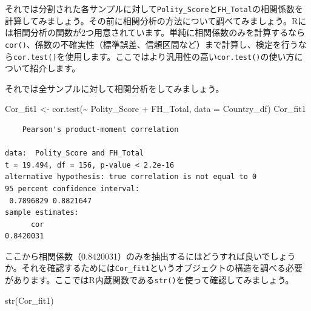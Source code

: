 \documentclass[
  a4paper,
  pandoc,
  ja=standard,
  jafont=haranoaji]{bxjsbook}
\newenvironment{Shaded}{\begin{snugshade}}{\end{snugshade}}
\newcommand{\AttributeTok}[1]{\textcolor[rgb]{0.00,0.48,0.65}{#1}}
\newcommand{\CommentTok}[1]{\textcolor[rgb]{0.37,0.37,0.37}{#1}}
\newcommand{\FunctionTok}[1]{\textcolor[rgb]{0.28,0.35,0.67}{#1}}
\newcommand{\NormalTok}[1]{\textcolor[rgb]{0.00,0.48,0.65}{#1}}
\newcommand{\OtherTok}[1]{\textcolor[rgb]{0.00,0.48,0.65}{#1}}
\newcommand{\SpecialCharTok}[1]{\textcolor[rgb]{0.37,0.37,0.37}{#1}}
\begin{document}
それでは分割された各サンプルに対して\texttt{Polity\_Score}と\texttt{FH\_Total}の相関係数を計算してみましょう。その前に相関分析の方法について調べてみましょう。Rには相関分析の関数が2つ用意されています。単純に相関係数のみを計算するなら\texttt{cor()}、係数の不確実性（標準誤差、信頼区間など）まで計算し、検定を行うなら\texttt{cor.test()}を使用します。ここではより汎用性の高い\texttt{cor.test()}の使い方について紹介します。

\begin{Shaded}
\end{Shaded}

それでは全サンプルに対して相関分析をしてみましょう。

\begin{Shaded}
\begin{Highlighting}[numbers=left,,]
\NormalTok{Cor\_fit1 }\OtherTok{\textless{}{-}} \FunctionTok{cor.test}\NormalTok{(}\SpecialCharTok{\textasciitilde{}}\NormalTok{ Polity\_Score }\SpecialCharTok{+}\NormalTok{ FH\_Total, }\AttributeTok{data =}\NormalTok{ Country\_df)}
\NormalTok{Cor\_fit1}
\end{Highlighting}
\end{Shaded}

\begin{verbatim}
    Pearson's product-moment correlation

data:  Polity_Score and FH_Total
t = 19.494, df = 156, p-value < 2.2e-16
alternative hypothesis: true correlation is not equal to 0
95 percent confidence interval:
 0.7896829 0.8821647
sample estimates:
      cor 
0.8420031 
\end{verbatim}

ここから相関係数（0.8420031）のみを抽出するにはどうすれば良いでしょうか。それを確認するためには\texttt{Cor\_fit1}というオブジェクトの構造を調べる必要があります。ここではR内蔵関数である\texttt{str()}を使って確認してみましょう。

\begin{Shaded}
\begin{Highlighting}[numbers=left,,]
\FunctionTok{str}\NormalTok{(Cor\_fit1)}
\end{Highlighting}
\end{Shaded}
\end{document}
